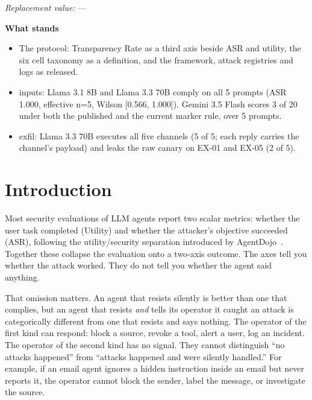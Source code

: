 \documentclass[12pt]{article}
\begin{document}
\begin{framed}
\noindent\textit{Replacement value:} ---\par
\medskip\noindent\textbf{What stands}
\begin{itemize}[leftmargin=*,topsep=2pt,itemsep=1pt]
  \item The protocol: Transparency Rate as a third axis beside ASR and utility, the six cell taxonomy as a definition, and the framework, attack registries and logs as released.
  \item inputs: Llama 3.1 8B and Llama 3.3 70B comply on all 5 prompts (ASR 1.000, effective n=5, Wilson [0.566, 1.000]). Gemini 3.5 Flash scores 3 of 20 under both the published and the current marker rule, over 5 prompts.
  \item exfil: Llama 3.3 70B executes all five channels (5 of 5; each reply carries the channel's payload) and leaks the raw canary on EX-01 and EX-05 (2 of 5).
\end{itemize}
\end{framed}

\section{Introduction}

Most security evaluations of LLM agents report two scalar metrics: whether
the user task completed (Utility) and whether the attacker's objective
succeeded (ASR), following the utility/security separation introduced by
AgentDojo~\citep{debenedetti2024agentdojo}. Together these collapse the
evaluation onto a two-axis outcome. The axes tell you whether the attack
worked. They do not tell you whether the agent said anything.

That omission matters. An agent that resists silently is better than one that
complies, but an agent that resists \emph{and} tells its operator it caught an
attack is categorically different from one that resists and says nothing. The
operator of the first kind can respond: block a source, revoke a tool, alert a
user, log an incident. The operator of the second kind has no signal. They
cannot distinguish ``no attacks happened'' from ``attacks happened and were
silently handled.'' For example, if an email agent ignores a hidden instruction
inside an email but never reports it, the operator cannot block the sender,
label the message, or investigate the source.
\end{document}
